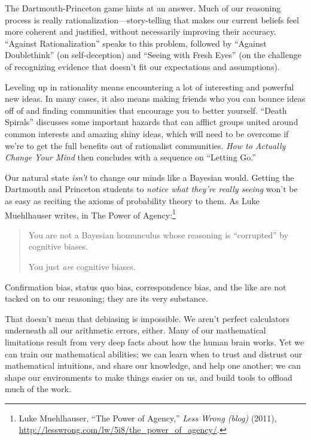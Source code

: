 {
 The Dartmouth-Princeton game hints at an answer. Much of our
reasoning process is really rationalization---story-telling that makes
our current beliefs feel more coherent and justified, without
necessarily improving their accuracy. ``Against
Rationalization'' speaks to this problem, followed by
``Against Doublethink'' (on
self-deception) and ``Seeing with Fresh
Eyes'' (on the challenge of recognizing evidence that
doesn't fit our expectations and assumptions).}

{
 Leveling up in rationality means encountering a lot of interesting
and powerful new ideas. In many cases, it also means making friends who
you can bounce ideas off of and finding communities that encourage you
to better yourself. ``Death
Spirals'' discusses some important hazards that can
afflict groups united around common interests and amazing shiny ideas,
which will need to be overcome if we're to get the full
benefits out of rationalist communities. \textit{How to Actually Change
Your Mind} then concludes with a sequence on ``Letting
Go.''}

{
 Our natural state \textit{isn't} to change our
minds like a Bayesian would. Getting the Dartmouth and Princeton
students to \textit{notice what they're really seeing}
won't be as easy as reciting the axioms of probability
theory to them. As Luke Muehlhauser writes, in The Power of
Agency:\footnote{Luke Muehlhauser, ``The Power of
Agency,'' \textit{Less Wrong (blog)} (2011),
\url{http://lesswrong.com/lw/5i8/the\_power\_of\_agency/}.}}

\begin{quote}
{
 You are not a Bayesian homunculus whose reasoning is
``corrupted'' by cognitive biases.}

{
  You just \textit{are} cognitive biases.}
\end{quote}

{
 Confirmation bias, status quo bias, correspondence bias, and the
like are not tacked on to our reasoning; they are its very substance.}

{
 That doesn't mean that debiasing is impossible. We
aren't perfect calculators underneath all our
arithmetic errors, either. Many of our mathematical limitations result
from very deep facts about how the human brain works. Yet we can train
our mathematical abilities; we can learn when to trust and distrust our
mathematical intuitions, and share our knowledge, and help one another;
we can shape our environments to make things easier on us, and build
tools to offload much of the work.}


